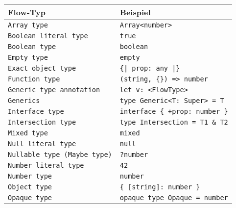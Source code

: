 \begin{table}
  \begin{tabular}{@{}ll@{}}
    \toprule
    \textbf{Flow-Typ}               & \textbf{Beispiel}                                                 \\
    \midrule
    \texttt{Array type}                 & \texttt{Array<{}number>{}}                               \\
    \texttt{Boolean literal type}       & \texttt{true}                                            \\
    \texttt{Boolean type}               & \texttt{boolean}                                         \\
    \texttt{Empty type}                 & \texttt{empty}                                           \\
    \texttt{Exact object type}          & \texttt{\{| prop: any |\}}                               \\
    \texttt{Function type}              & \texttt{(string, \{\}) => number}                        \\
    \texttt{Generic type annotation}    & \texttt{let v: <{}FlowType>{}}                           \\
    \texttt{Generics}                   & \texttt{type Generic<{}T: Super> = T}                    \\
    \texttt{Interface type}             & \texttt{interface \{ +prop: number \}}                   \\
    \texttt{Intersection type}          & \texttt{type Intersection = T1 \& T2}                    \\
    \texttt{Mixed type}                 & \texttt{mixed}                                           \\
    \texttt{Null literal type}          & \texttt{null}                                            \\
    \texttt{Nullable type (Maybe type)} & \texttt{?number}                                         \\
    \texttt{Number literal type}        & \texttt{42}                                              \\
    \texttt{Number type}                & \texttt{number}                                          \\
    \texttt{Object type}                & \texttt{\{ {[}string{]}: number \}}                      \\
    \texttt{Opaque type}                & \texttt{opaque type Opaque = number}                     \\

\end{tabular}
\end{table}
